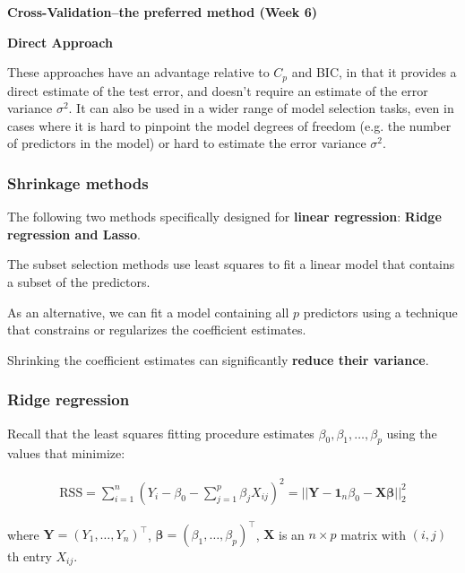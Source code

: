 \bigskip

\noindent\textbf{Cross-Validation–the preferred method (Week 6)}

\bigskip

\noindent\textbf{Direct Approach}

These approaches have an advantage relative to $C_p$ and BIC, in that it provides a direct estimate of the test error, and doesn’t require an estimate of the error variance $\sigma^2$.
It can also be used in a wider range of model selection tasks, even in cases where it is hard to pinpoint the model degrees of freedom (e.g. the number of predictors in the model) or hard to estimate the error variance $\sigma^2$.

\subsubsection{Shrinkage methods}

\indent 

The following two methods specifically designed for \textbf{linear regression}: \textbf{Ridge regression and Lasso}.

The subset selection methods use least squares to fit a linear model that contains a subset of the predictors.

As an alternative, we can fit a model containing all $p$ predictors using a technique that constrains or regularizes the coefficient estimates.

Shrinking the coefficient estimates can significantly \textbf{reduce their variance}.

\subsubsection{Ridge regression}

\indent 

Recall that the least squares fitting procedure estimates $\beta_0,\beta_1,\ldots,\beta_p$ using the values that minimize:

\begin{align*}
    \text{RSS} = \sum_{i=1}^n(Y_i - \beta_0 - \sum_{j=1}^p \beta_jX_{ij})^2 = ||\boldsymbol{Y} - \boldsymbol{1}_n\beta_0 - \boldsymbol{X\beta}||_2^2
\end{align*}

where $\boldsymbol{Y} = (Y_1,\ldots,Y_n)^\top$, $\boldsymbol{\beta} = (\beta_1,\ldots,\beta_p)^\top$, $\boldsymbol{X}$ is an $n\times p$ matrix with $(i,j)$th entry $X_{ij}$.

